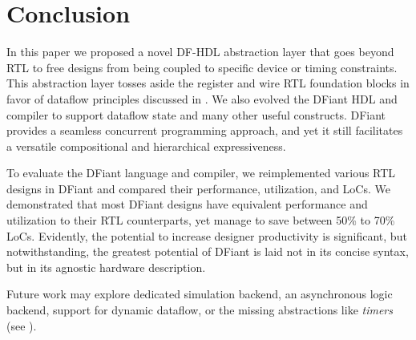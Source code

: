 \section{Conclusion}
\label{sec:conclusion}
In this paper we proposed a novel DF-HDL abstraction layer that goes beyond RTL to free designs from being coupled to specific device or timing constraints. This abstraction layer tosses aside the register and wire RTL foundation blocks in favor of dataflow principles discussed in . We also evolved the DFiant HDL and compiler to support dataflow state and many other useful constructs. DFiant provides a seamless concurrent programming approach, and yet it still facilitates a versatile compositional and hierarchical expressiveness. 

To evaluate the DFiant language and compiler, we reimplemented various RTL designs in DFiant and compared their performance, utilization, and LoCs. We demonstrated that most DFiant designs have equivalent performance and utilization to their RTL counterparts, yet manage to save between 50\% to 70\% LoCs. Evidently, the potential to increase designer productivity is significant, but notwithstanding, the greatest potential of DFiant is laid not in its concise syntax, but in its agnostic hardware description.  


Future work may explore dedicated simulation backend, an asynchronous logic backend, support for dynamic dataflow, or the missing abstractions like \emph{timers} (see ).

